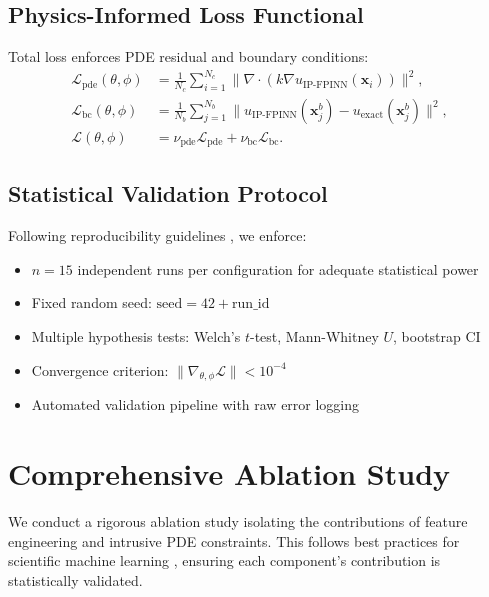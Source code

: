 \documentclass[sn-mathphys]{sn-jnl}
\begin{document}
	\subsection{Physics-Informed Loss Functional}
	Total loss enforces PDE residual and boundary conditions:
	\begin{subequations}
		\begin{align}
		\mathcal{L}_{\text{pde}}(\theta,\phi) &= \frac{1}{N_c}\sum_{i=1}^{N_c}\bigl\|\nabla\cdot(k\nabla u_{\text{IP-FPINN}}(\mathbf{x}_i))\bigr\|^2, \\
		\mathcal{L}_{\text{bc}}(\theta,\phi) &= \frac{1}{N_b}\sum_{j=1}^{N_b}\bigl\|u_{\text{IP-FPINN}}(\mathbf{x}_j^b)-u_{\text{exact}}(\mathbf{x}_j^b)\bigr\|^2, \\
		\mathcal{L}(\theta,\phi) &= \nu_{\text{pde}} \mathcal{L}_{\text{pde}} + \nu_{\text{bc}} \mathcal{L}_{\text{bc}}. \label{eq:loss_functional}
		\end{align}
	\end{subequations}
	
	\subsection{Statistical Validation Protocol}
	Following reproducibility guidelines \citep{hutson2018artificial}, we enforce:
	\begin{itemize}
		\item $n=15$ independent runs per configuration for adequate statistical power
		\item Fixed random seed: $\text{seed}=42 + \text{run\_id}$
		\item Multiple hypothesis tests: Welch's $t$-test, Mann-Whitney $U$, bootstrap CI
		\item Convergence criterion: $\|\nabla_{\theta,\phi}\mathcal{L}\| < 10^{-4}$
		\item Automated validation pipeline with raw error logging
	\end{itemize}
	
	\section{Comprehensive Ablation Study}
	\label{sec:ablation}
	
	We conduct a rigorous ablation study isolating the contributions of feature engineering and intrusive PDE constraints. This follows best practices for scientific machine learning \citep{Henderson2018DeepRL, Lucic2018GANGO}, ensuring each component's contribution is statistically validated.
	
\end{document}
